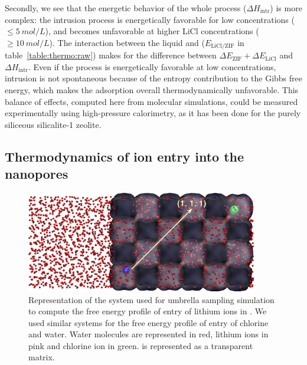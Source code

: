 \documentclass[thesis]{subfiles}
\begin{document}
Secondly, we see that the energetic behavior of the whole process ($\Delta
H_\text{intr}$) is more complex: the intrusion process is energetically
favorable for low concentrations ($\leq \SI{5}{mol/L}$), and becomes unfavorable
at higher LiCl concentrations ($\geq \SI{10}{mol/L}$). The interaction between
the liquid and  ($E_\text{LiCl/ZIF}$ in table~\ref{table:thermo:raw}) makes
for the difference between $\Delta E_\text{ZIF} + \Delta E_\text{LiCl}$ and
$\Delta H_\text{intr}$. Even if the process is energetically favorable at low
concentrations, intrusion is not spontaneous because of the entropy contribution
to the Gibbs free energy, which makes the adsorption overall thermodynamically
unfavorable. This balance of effects, computed here from molecular simulations,
could be measured experimentally using high-pressure calorimetry, as it has been
done for the purely siliceous silicalite-1 zeolite\cite{Karbowiak2009,
Karbowiak2010}.

\newpage
\subsection{Thermodynamics of ion entry into the nanopores}

\begin{figure}[ht]
    \centering
    \includegraphics[width=0.9\textwidth]{figures/images/licl-zif-umbrella}
    \caption{Representation of the system used for umbrella sampling simulation
    to compute the free energy profile of entry of lithium ions in . We
    used similar systems for the free energy profile of entry of chlorine and
    water. Water molecules are represented in red, lithium ions in pink and
    chlorine ion in green.  is represented as a transparent matrix.}
    \label{fig:licl-zif:umbrella-system}
\end{figure}
\end{document}
